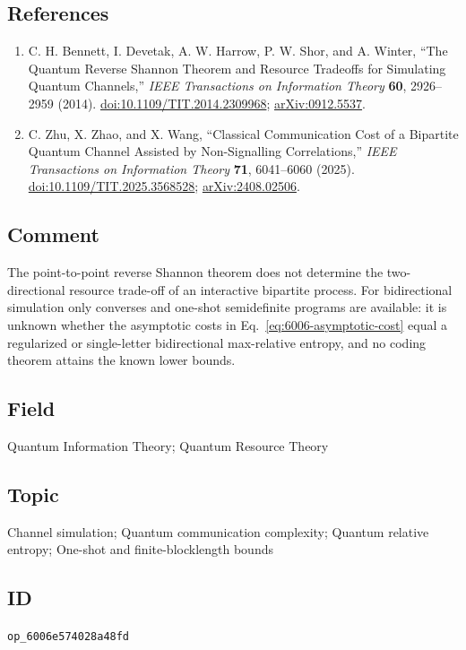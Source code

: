 \subsection*{References}

\begin{enumerate}[label={},leftmargin=4.8em,labelsep=0.5em]
  \footnotesize
  \item[\textup{[BDHSW14]}]\label{ref:6006-bdhsw}
  C. H. Bennett, I. Devetak, A. W. Harrow, P. W. Shor, and A. Winter,
  ``The Quantum Reverse Shannon Theorem and Resource Tradeoffs for
  Simulating Quantum Channels,'' \emph{IEEE Transactions on Information
  Theory} \textbf{60}, 2926--2959 (2014).
  \href{https://doi.org/10.1109/TIT.2014.2309968}{doi:10.1109/TIT.2014.2309968};
  \href{https://arxiv.org/abs/0912.5537}{arXiv:0912.5537}.

  \item[\textup{[ZZW25]}]\label{ref:6006-zhu-zhao-wang}
  C. Zhu, X. Zhao, and X. Wang, ``Classical Communication Cost of a
  Bipartite Quantum Channel Assisted by Non-Signalling Correlations,''
  \emph{IEEE Transactions on Information Theory} \textbf{71}, 6041--6060
  (2025).
  \href{https://doi.org/10.1109/TIT.2025.3568528}{doi:10.1109/TIT.2025.3568528};
  \href{https://arxiv.org/abs/2408.02506}{arXiv:2408.02506}.
\end{enumerate}

\subsection*{Comment}

The point-to-point reverse Shannon theorem does not determine the
two-directional resource trade-off of an interactive bipartite process.
For bidirectional simulation only converses and one-shot semidefinite
programs are available: it is unknown whether the asymptotic costs in
Eq.~\eqref{eq:6006-asymptotic-cost} equal a regularized or single-letter
bidirectional max-relative entropy, and no coding theorem attains the known
lower bounds.

\subsection*{Field}

Quantum Information Theory; Quantum Resource Theory

\subsection*{Topic}

Channel simulation; Quantum communication complexity; Quantum relative entropy; One-shot and finite-blocklength bounds

\subsection*{ID}

\texttt{op\_6006e574028a48fd}
